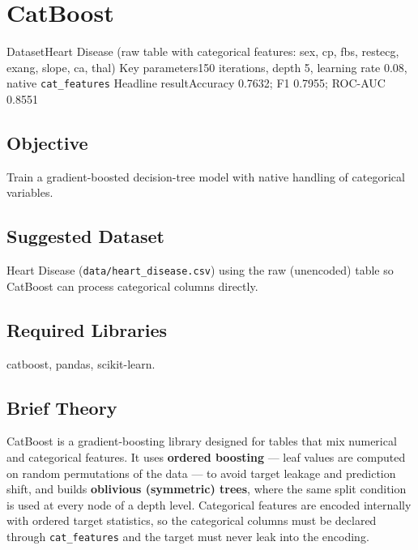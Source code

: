 \chapter{CatBoost}\label{exp:12}


\quickfacts
  {Dataset}{Heart Disease (raw table with categorical features: sex, cp, fbs, restecg, exang, slope, ca, thal)}
  {Key parameters}{150 iterations, depth 5, learning rate 0.08, native \texttt{cat\_features}}
  {Headline result}{Accuracy 0.7632; F1 0.7955; ROC-AUC 0.8551}

\section{Objective}
Train a gradient-boosted decision-tree model with native handling of categorical
variables.

\section{Suggested Dataset}
Heart Disease (\texttt{data/heart\_disease.csv}) using the raw (unencoded) table so CatBoost
can process categorical columns directly.

\section{Required Libraries}
catboost, pandas, scikit-learn.

\section{Brief Theory}
CatBoost is a gradient-boosting library designed for tables that mix numerical and categorical
features. It uses \textbf{ordered boosting} --- leaf values are computed on random permutations
of the data --- to avoid target leakage and prediction shift, and builds \textbf{oblivious
(symmetric) trees}, where the same split condition is used at every node of a depth level.
Categorical features are encoded internally with ordered target statistics, so the categorical
columns must be declared through \texttt{cat\_features} and the target must never leak into the
encoding.

